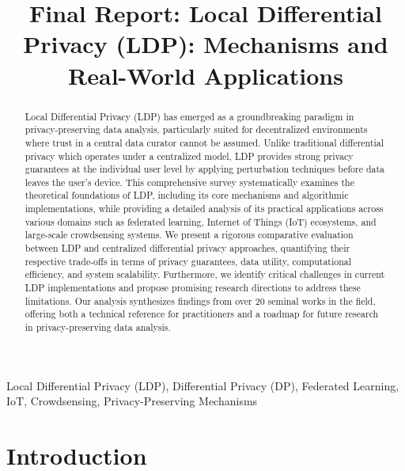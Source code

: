 \documentclass[conference]{IEEEtran}
\begin{document}
\title{Final Report: Local Differential Privacy (LDP): Mechanisms and
Real-World Applications}

\author{
}

\maketitle

\begin{abstract}
Local Differential Privacy (LDP) has emerged as a groundbreaking paradigm in privacy-preserving data analysis, particularly suited for decentralized environments where trust in a central data curator cannot be assumed. Unlike traditional differential privacy which operates under a centralized model, LDP provides strong privacy guarantees at the individual user level by applying perturbation techniques before data leaves the user's device. This comprehensive survey systematically examines the theoretical foundations of LDP, including its core mechanisms and algorithmic implementations, while providing a detailed analysis of its practical applications across various domains such as federated learning, Internet of Things (IoT) ecosystems, and large-scale crowdsensing systems. We present a rigorous comparative evaluation between LDP and centralized differential privacy approaches, quantifying their respective trade-offs in terms of privacy guarantees, data utility, computational efficiency, and system scalability. Furthermore, we identify critical challenges in current LDP implementations and propose promising research directions to address these limitations. Our analysis synthesizes findings from over 20 seminal works in the field, offering both a technical reference for practitioners and a roadmap for future research in privacy-preserving data analysis.
\end{abstract}

\begin{IEEEkeywords}
Local Differential Privacy (LDP), Differential Privacy (DP), Federated Learning, IoT, Crowdsensing, Privacy-Preserving Mechanisms
\end{IEEEkeywords}

\section{Introduction}
\end{document}
